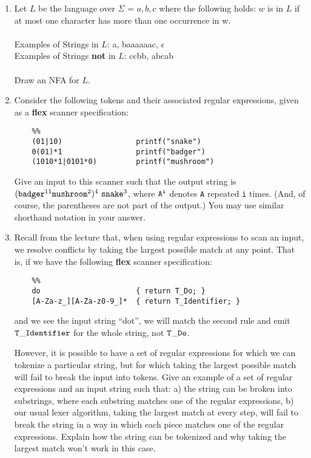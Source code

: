 \documentclass[11pt]{article}
\begin{document}
\begin{enumerate}
    \item Let $L$ be the language over $\Sigma$ = ${a,b,c}$ where the following holds: $w$ is in $L$ if at most one character has more than one occurrence in w.   \\ \\ 
Examples of Strings in $L$: a, baaaaaac, $\epsilon$ \\  
Examples of Strings \textbf{not} in $L$: ccbb, abcab\\ \\  
Draw an NFA for $L$.
  
  \item Consider the following tokens and their associated regular expressions, given as a \textbf{flex} scanner specification:
  
  \begin{lstlisting}
    %%
    (01|10)                 printf("snake")
    0(01)*1                 printf("badger")
    (1010*1|0101*0)         printf("mushroom")
  \end{lstlisting}
  
  Give an input to this scanner such that the output string is $\tt (badger^{\rm 11}  mushroom^{\rm 2})^{\rm 4}\ snake^{\rm 3}$, where $\tt A^i$ denotes {\tt A} repeated {\tt i} times.   (And, of course, the parentheses are not part of the output.)  You may use similar shorthand notation in your answer.
  
  \item Recall from the lecture that, when using regular expressions to scan an input, we resolve conflicts by taking the largest possible match at any point. That is, if we have the following \textbf{flex} scanner specification:
  
  \begin{lstlisting}
    %%
    do                      { return T_Do; }
    [A-Za-z_][A-Za-z0-9_]*  { return T_Identifier; }
  \end{lstlisting} 
  
  and we see the input string ``dot'', we will match the second rule and emit $\tt T\_Identifier$ for the whole string, not $\tt T\_Do$.
  
  However, it is possible to have a set of regular expressions for which we can tokenize a particular string, but for which taking the largest possible match will fail to break the input into tokens. Give an example of a set of regular expressions and an input string such that: a) the string can be broken into substrings, where each substring matches one of the regular expressions, b) our usual lexer algorithm, taking the largest match at every step, will fail to break the string in a way in which each piece matches one of the regular expressions. Explain how the string can be tokenized and why taking the largest match won't work in this case.

\end{enumerate}
\end{document}
